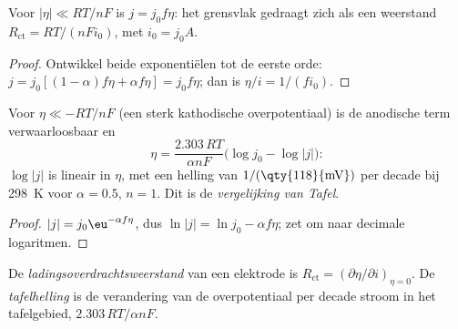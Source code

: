 \begin{corollary}[Ladingsoverdrachtsweerstand]\label{cor:b3:electrode-kinetics:linear}
Voor $|\eta| \ll RT/nF$ is $j = j_0f\eta$: het grensvlak gedraagt zich als
een weerstand
$R_{\mathrm{ct}} = RT/(nFi_0)$, met $i_0 = j_0A$.
\end{corollary}

\begin{proof}
Ontwikkel beide exponentiëlen tot de eerste orde: $j = j_0[(1 - \alpha)f\eta + \alpha f\eta] = j_0f\eta$; dan is
$\eta/i = 1/(fi_0)$.
\end{proof}

\begin{corollary}\label{cor:b3:electrode-kinetics:tafel}
Voor $\eta \ll -RT/nF$ (een sterk kathodische overpotentiaal) is de
anodische term verwaarloosbaar en
\[
  \eta = \frac{2.303\,RT}{\alpha nF}\bigl(\log j_0 - \log|j|\bigr):
\]
$\log|j|$ is lineair in $\eta$, met een helling van $1/(\text{\qty{118}{mV}})$ per decade bij \qty{298}{K} voor $\alpha = 0.5$, $n =
1$. Dit is de \emph{vergelijking van Tafel}.
\end{corollary}

\begin{proof}
$|j| = j_0\eu^{-\alpha f\eta}$, dus $\ln|j| = \ln j_0 - \alpha f\eta$; zet om naar
decimale logaritmen.
\end{proof}

\begin{definition}\label{def:b3:electrode-kinetics:charge-transfer}
De \emph{ladingsoverdrachtsweerstand}
van een elektrode is $R_{\mathrm{ct}} = (\partial\eta/\partial i)_{\eta = 0}$. De
\emph{tafelhelling}
is de verandering van de overpotentiaal per decade stroom in het
tafelgebied,
$2.303\,RT/\alpha nF$.
\end{definition}

